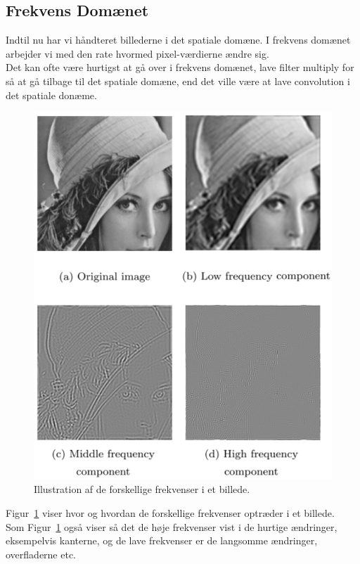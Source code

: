 \subsection{Frekvens Domænet}
Indtil nu har vi håndteret billederne i det spatiale domæne. I frekvens domænet arbejder vi med den rate hvormed pixel-værdierne ændre sig.\\

Det kan ofte være hurtigst at gå over i frekvens domænet, lave filter multiply for så at gå tilbage til det spatiale domæne, end det ville være at lave convolution i det spatiale donæme. 

\begin{figure}[H]
	\centering
	\includegraphics[width=0.7\linewidth]{figs/spm05/frequencies}
	\caption{Illustration af de forskellige frekvenser i et billede.}
	\label{fig:frequencies}
\end{figure}

Figur~\ref{fig:frequencies} viser hvor og hvordan de forskellige frekvenser optræder i et billede.\\

Som Figur~\ref{fig:frequencies} også viser så det de høje frekvenser vist i de hurtige ændringer, eksempelvis kanterne, og de lave frekvenser er de langsomme ændringer, overfladerne etc.